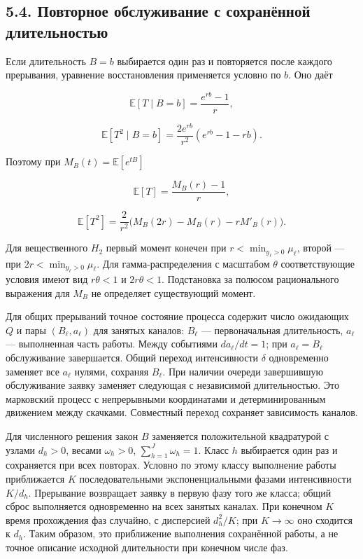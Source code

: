 \subsection*{5.4. Повторное обслуживание с сохранённой длительностью}
Если длительность \(B=b\) выбирается один раз и повторяется после каждого прерывания, уравнение восстановления применяется условно по \(b.\) Оно даёт


\[\mathbb E[T\mid B=b]=\frac{e^{rb}-1}{r},\]

\[\mathbb E[T^2\mid B=b]=\frac{2e^{rb}}{r^2}(e^{rb}-1-rb).\]


Поэтому при \(M_B(t)=\mathbb E[e^{tB}]\)


\[\mathbb E[T]=\frac{M_B(r)-1}{r},\]

\[\mathbb E[T^2]=\frac{2}{r^2}\bigl(M_B(2r)-M_B(r)-rM'_B(r)\bigr).\]


Для вещественного \(H_2\) первый момент конечен при \(r<\min_{y_\ell>0}\mu_\ell\), второй --- при \(2r<\min_{y_\ell>0}\mu_\ell.\) Для гамма-распределения с масштабом \(\theta\) соответствующие условия имеют вид \(r\theta<1\) и \(2r\theta<1.\) Подстановка за полюсом рационального выражения для \(M_B\) не определяет существующий момент.

Для общих прерываний точное состояние процесса содержит число ожидающих \(Q\) и пары \((B_\ell,a_\ell)\) для занятых каналов: \(B_\ell\) --- первоначальная длительность, \(a_\ell\) --- выполненная часть работы. Между событиями \(da_\ell/dt=1\); при \(a_\ell=B_\ell\) обслуживание завершается. Общий переход интенсивности \(\delta\) одновременно заменяет все \(a_\ell\) нулями, сохраняя \(B_\ell.\) При наличии очереди завершившую обслуживание заявку заменяет следующая с независимой длительностью. Это марковский процесс с непрерывными координатами и детерминированным движением между скачками. Совместный переход сохраняет зависимость каналов.

Для численного решения закон \(B\) заменяется положительной квадратурой с узлами \(d_h>0\), весами \(\omega_h>0\), \(\sum_{h=1}^J\omega_h=1.\) Класс \(h\) выбирается один раз и сохраняется при всех повторах. Условно по этому классу выполнение работы приближается \(K\) последовательными экспоненциальными фазами интенсивности \(K/d_h.\) Прерывание возвращает заявку в первую фазу того же класса; общий сброс выполняется одновременно на всех занятых каналах. При конечном \(K\) время прохождения фаз случайно, с дисперсией \(d_h^2/K\); при \(K\to\infty\) оно сходится к \(d_h.\) Таким образом, это приближение выполнения сохранённой работы, а не точное описание исходной длительности при конечном числе фаз.

